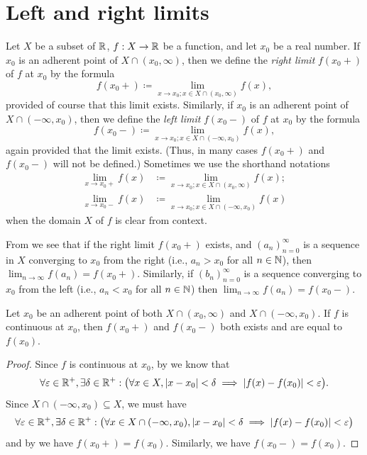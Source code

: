 \section{Left and right limits}\label{i:sec:9.5}

\begin{defn}\label{i:9.5.1}
  Let \(X\) be a subset of \(\mathbb{R}\), \(f : X \to \mathbb{R}\) be a function, and let \(x_0\) be a real number.
  If \(x_0\) is an adherent point of \(X \cap (x_0, \infty)\), then we define the \emph{right limit} \(f(x_0+)\) of \(f\) at \(x_0\) by the formula
  \[
    f(x_0+) \coloneqq \lim_{x \to x_0 ; x \in X \cap (x_0, \infty)} f(x),
  \]
  provided of course that this limit exists.
  Similarly, if \(x_0\) is an adherent point of \(X \cap (-\infty, x_0)\), then we define the \emph{left limit} \(f(x_0-)\) of \(f\) at \(x_0\) by the formula
  \[
    f(x_0-) \coloneqq \lim_{x \to x_0 ; x \in X \cap (-\infty, x_0)} f(x),
  \]
  again provided that the limit exists.
  (Thus, in many cases \(f(x_0+)\) and \(f(x_0-)\) will not be defined.)
  Sometimes we use the shorthand notations
  \begin{align*}
    \lim_{x \to x_0+} f(x) & \coloneqq \lim_{x \to x_0 ; x \in X \cap (x_0, \infty)} f(x); \\
    \lim_{x \to x_0-} f(x) & \coloneqq \lim_{x \to x_0 ; x \in X \cap (-\infty, x_0)} f(x)
  \end{align*}
  when the domain \(X\) of \(f\) is clear from context.
\end{defn}

\begin{note}
  From  we see that if the right limit \(f(x_0+)\) exists, and \((a_n)_{n = 0}^\infty\) is a sequence in \(X\) converging to \(x_0\) from the right (i.e., \(a_n > x_0\) for all \(n \in \mathbb{N}\)), then \(\lim_{n \to \infty} f(a_n) = f(x_0+)\).
  Similarly, if \((b_n)_{n = 0}^\infty\) is a sequence converging to \(x_0\) from the left (i.e., \(a_n < x_0\) for all \(n \in \mathbb{N}\)) then \(\lim_{n \to \infty} f(a_n) = f(x_0-)\).
\end{note}

\begin{ac}\label{i:ac:9.5.1}
  Let \(x_0\) be an adherent point of both \(X \cap (x_0, \infty)\) and \(X \cap (-\infty, x_0)\).
  If \(f\) is continuous at \(x_0\), then \(f(x_0+)\) and \(f(x_0-)\) both exists and are equal to \(f(x_0)\).
\end{ac}

\begin{proof}
  Since \(f\) is continuous at \(x_0\), by  we know that
  \[
    \forall \varepsilon \in \mathbb{R}^+, \exists \delta \in \mathbb{R}^+ : \big(\forall x \in X, \left\lvert x - x_0\right\rvert < \delta \implies \left\lvert f(x) - f(x_0)\right\rvert < \varepsilon\big).
  \]
  Since \(X \cap (-\infty, x_0) \subseteq X\), we must have
  \[
    \forall \varepsilon \in \mathbb{R}^+, \exists \delta \in \mathbb{R}^+ : \big(\forall x \in X \cap (-\infty, x_0), \left\lvert x - x_0\right\rvert < \delta \implies \left\lvert f(x) - f(x_0)\right\rvert < \varepsilon\big)
  \]
  and by  we have \(f(x_0+) = f(x_0)\).
  Similarly, we have \(f(x_0-) = f(x_0)\).
\end{proof}

